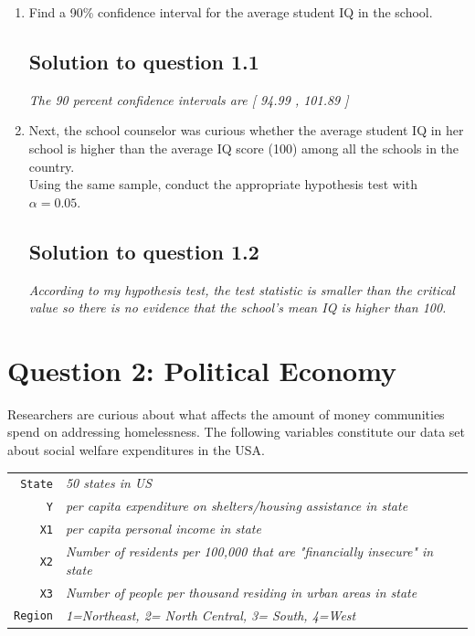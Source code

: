 \documentclass[12pt,letterpaper]{article}
\begin{document}
\begin{enumerate}
	\item Find a 90\% confidence interval for the average student IQ in the school.\\
		
		\subsection*{Solution to question 1.1}
			  
		\textit{The 90 percent confidence intervals are [ 94.99 , 101.89 ]}
	\item Next, the school counselor was curious  whether  the average student IQ in her school is higher than the average IQ score (100) among all the schools in the country.\\ 
	
	\noindent Using the same sample, conduct the appropriate hypothesis test with $\alpha=0.05$.
	\subsection*{Solution to question 1.2}
	
	  
	\textit{According to my hypothesis test, the test statistic is smaller than the critical value so there is no evidence that the school's mean IQ is higher than 100.}
\end{enumerate}

\newpage

	\section*{Question 2: Political Economy}

\noindent Researchers are curious about what affects the amount of money communities spend on addressing homelessness. The following variables constitute our data set about social welfare expenditures in the USA. \\
\vspace{.5cm}


\begin{tabular}{r|l}
	\texttt{State} &\emph{50 states in US} \\
	\texttt{Y} & \emph{per capita expenditure on shelters/housing assistance in state}\\
	\texttt{X1} &\emph{per capita personal income in state} \\
	\texttt{X2} &  \emph{Number of residents per 100,000 that are "financially insecure" in state}\\
	\texttt{X3} &  \emph{Number of people per thousand residing in urban areas in state} \\
	\texttt{Region} &  \emph{1=Northeast, 2= North Central, 3= South, 4=West} \\
\end{tabular}
\end{document}
